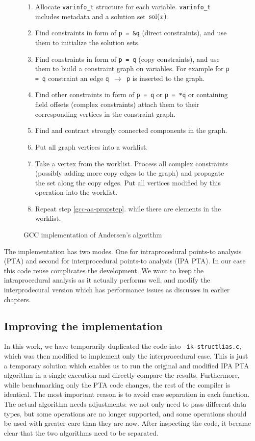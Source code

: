 \begin{figure}[h!]
\begin{tcolorbox}
\begin{enumerate}
	\item Allocate {\tt varinfo\_t} structure for each variable. {\tt varinfo\_t} includes
		metadata and a solution set $\operatorname*{\,sol}(x)$.
	\item Find constraints in form of {\tt p = \&q} (direct constraints), and
		use them to initialize the solution sets.
	\item Find constraints in form of {\tt p = q} (copy constraints), and use
		them to build a constraint graph on variables. For example for {\tt p =
		q} constraint an edge {\tt q $\to$ p} is inserted to the graph.
	\item Find other constraints in form of {\tt *p = q} or {\tt p = *q} or
		containing field offsets (complex constraints) attach them to their
		corresponding vertices in the constraint graph.
	\item Find and contract strongly connected components in the graph.
	\item Put all graph vertices into a worklist.
	\item Take a vertex from the worklist. Process all complex constraints
		(possibly adding more copy edges to the graph) and propagate the set
		along the copy edges. Put all vertices modified by this operation into the
		worklist.
	\label{gcc-aa-propstep}
	\item Repeat step \ref{gcc-aa-propstep}. while there are elements in the worklist.
\end{enumerate}
\end{tcolorbox}
\caption{GCC implementation of Andersen's algorithm}
\label{figure-gcc-aliasalg}
\end{figure}

The implementation has two modes. One for intraprocedural points-to analysis
(PTA) and second for interprocedural points-to analysis (IPA PTA). In our case
this code reuse complicates the development. We want to keep the
intraprocedural analysis as it actually performs well, and modify the
interprodecural version which has performance issues as discusses in earlier
chapters.

\subsection{Improving the implementation}

In this work, we have temporarily duplicated the code into {\tt
ik-structlias.c}, which was then modified to implement only the interprocedural
case. This is just a temporary solution which enables us to run the original
and modified IPA PTA algorithm in a single execution and directly compare the
results. Furthermore, while benchmarking only the PTA code changes, the rest of
the compiler is identical.  The most important reason is to avoid case
separation in each function. The actual algorithm needs adjustments: we not
only need to pass different data types, but some operations are no longer
supported, and some operations should be used with greater care than they are
now. After inspecting the code, it became clear that the two algorithms need to
be separated.

